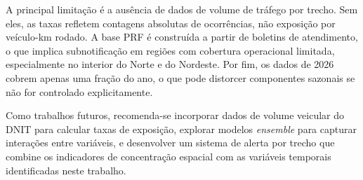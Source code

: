 \documentclass[12pt]{article}
\begin{document}
A principal limitação é a ausência de dados de volume de tráfego
por trecho. Sem eles, as taxas refletem contagens absolutas de
ocorrências, não exposição por veículo-km rodado. A base PRF é
construída a partir de boletins de atendimento, o que implica
subnotificação em regiões com cobertura operacional limitada,
especialmente no interior do Norte e do Nordeste. Por fim, os dados
de 2026 cobrem apenas uma fração do ano, o que pode distorcer
componentes sazonais se não for controlado explicitamente.

Como trabalhos futuros, recomenda-se incorporar dados de volume
veicular do DNIT para calcular taxas de exposição, explorar modelos
\textit{ensemble} para capturar interações entre variáveis, e
desenvolver um sistema de alerta por trecho que combine os
indicadores de concentração espacial com as variáveis temporais
identificadas neste trabalho.




\end{document}
